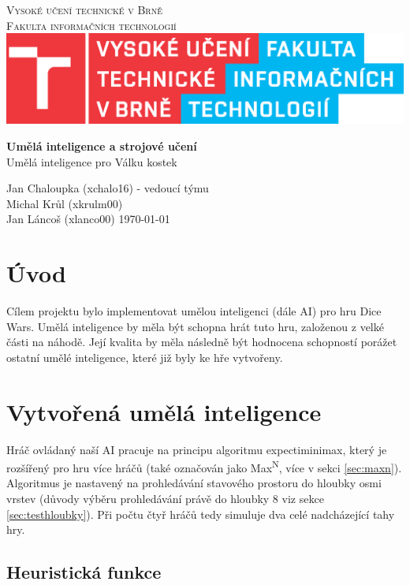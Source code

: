 \documentclass[a4paper]{article}
\begin{document}
\thispagestyle{empty}
\begin{center}
\LARGE
\textsc{Vysoké učení technické v Brně \\
Fakulta informačních technologií}\\
\includegraphics[width = 8 cm]{pic/FIT_barevne_CMYK_CZ.eps}

\LARGE
\textbf{Umělá inteligence a strojové učení}\\
Umělá inteligence pro Válku kostek \\

\end{center}
Jan Chaloupka (xchalo16) - vedoucí týmu \\
Michal Krůl (xkrulm00) \\
Jan Láncoš (xlanco00)
\hfill
\today

\newpage
\setcounter{page}{1}

\section{Úvod}

Cílem projektu bylo implementovat umělou inteligenci (dále AI) pro hru Dice Wars. Umělá inteligence by měla být schopna hrát tuto hru, založenou z velké části na náhodě. Její kvalita by měla následně být hodnocena schopností porážet ostatní umělé inteligence, které již byly ke hře vytvořeny.

\section{Vytvořená umělá inteligence}

Hráč ovládaný naší AI pracuje na principu algoritmu expectiminimax, který je rozšířený pro hru více hráčů (také označován jako Max\textsuperscript{N}, více v sekci \ref{sec:maxn}). Algoritmus je nastavený na prohledávání stavového prostoru do hloubky osmi vrstev (důvody výběru prohledávání právě do hloubky 8 viz sekce \ref{sec:testhloubky}). Při počtu čtyř hráčů tedy simuluje dva celé nadcházející tahy hry.

\subsection{Heuristická funkce}
\end{document}
